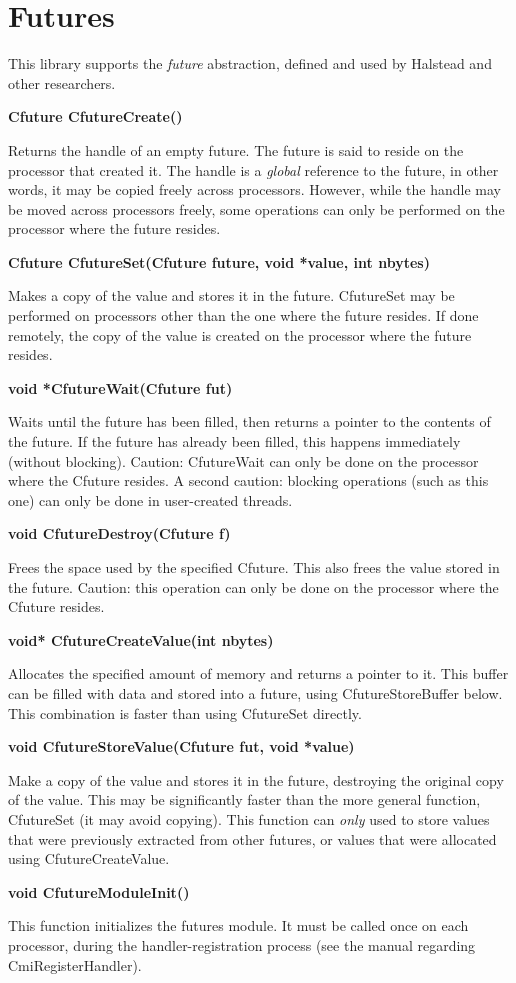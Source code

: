 \chapter{Futures}

This library supports the {\em future} abstraction, defined and used by
Halstead and other researchers.


{\bf Cfuture CfutureCreate()}

Returns the handle of an empty future.  The future is said to reside
on the processor that created it.  The handle is a {\em global}
reference to the future, in other words, it may be copied freely
across processors.  However, while the handle may be moved across
processors freely, some operations can only be performed on the
processor where the future resides.

{\bf Cfuture CfutureSet(Cfuture future, void *value, int nbytes)}

Makes a copy of the value and stores it in the future.  CfutureSet
may be performed on processors other than the one where the future
resides.  If done remotely, the copy of the value is created on the
processor where the future resides.

{\bf void *CfutureWait(Cfuture fut)}

Waits until the future has been filled, then returns a pointer to the
contents of the future.  If the future has already been filled, this
happens immediately (without blocking).  Caution: CfutureWait can only
be done on the processor where the Cfuture resides.  A second caution:
blocking operations (such as this one) can only be done in
user-created threads.

{\bf void CfutureDestroy(Cfuture f)}

Frees the space used by the specified Cfuture.  This also frees the
value stored in the future.  Caution: this operation can only be done
on the processor where the Cfuture resides.

{\bf void* CfutureCreateValue(int nbytes)}

Allocates the specified amount of memory and returns a pointer to it.
This buffer can be filled with data and stored into a future, using
CfutureStoreBuffer below.  This combination is faster than using
CfutureSet directly.

{\bf void CfutureStoreValue(Cfuture fut, void *value)}

Make a copy of the value and stores it in the future, destroying the
original copy of the value.  This may be significantly faster than the
more general function, CfutureSet (it may avoid copying).  This
function can {\em only} used to store values that were previously
extracted from other futures, or values that were allocated using
CfutureCreateValue.

{\bf void CfutureModuleInit()}

This function initializes the futures module.  It must be called once
on each processor, during the handler-registration process (see the
\converse{} manual regarding CmiRegisterHandler).

